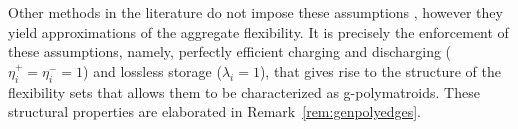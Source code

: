 Other methods in the literature do not impose these assumptions \cite{Taha2024AnPopulations, Muller2019AggregationResources}, however they yield approximations of the aggregate flexibility.
It is precisely the enforcement of these assumptions, namely, perfectly efficient charging and discharging ($\eta_i^+ = \eta_i^- = 1$) and lossless storage ($\lambda_i = 1$), that gives rise to the structure of the flexibility sets that allows them to be characterized as g-polymatroids. These structural properties are elaborated in Remark~\ref{rem:genpolyedges}.
